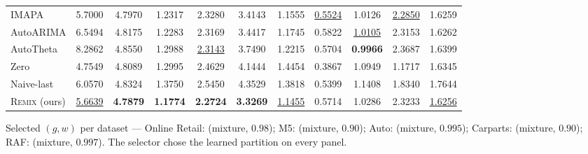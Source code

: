 \documentclass[twocolumn,10pt]{article}
\newcommand{\REMIX}{\textsc{Remix}}
\newcommand{\best}[1]{\textbf{#1}}
\newcommand{\secondbest}[1]{\underline{#1}}
\begin{document}
\begin{table}[t]
\begin{tabular}{lcc@{\hspace{10pt}}cc@{\hspace{10pt}}cc@{\hspace{10pt}}cc@{\hspace{10pt}}cc}
IMAPA & 5.7000 & 4.7970 & 1.2317 & 2.3280 & 3.4143 & 1.1555 & \secondbest{0.5524} & 1.0126 & \secondbest{2.2850} & 1.6259\\
AutoARIMA & 6.5494 & 4.8175 & 1.2283 & 2.3169 & 3.4417 & 1.1745 & 0.5822 & \secondbest{1.0105} & 2.3153 & 1.6262\\
AutoTheta & 8.2862 & 4.8550 & 1.2988 & \secondbest{2.3143} & 3.7490 & 1.2215 & 0.5704 & \best{0.9966} & 2.3687 & 1.6399\\
\midrule
Zero & 4.7549 & 4.8089 & 1.2995 & 2.4629 & 4.1444 & 1.4454 & 0.3867 & 1.0949 & 1.1717 & 1.6345\\
Naive-last & 6.0570 & 4.8324 & 1.3750 & 2.5450 & 4.3529 & 1.3818 & 0.5399 & 1.1408 & 1.8340 & 1.7644\\
\midrule
\REMIX{} (ours) & \secondbest{5.6639} & \best{4.7879} & \best{1.1774} & \best{2.2724} & \best{3.3269} & \secondbest{1.1455} & 0.5714 & 1.0286 & 2.3233 & \secondbest{1.6256}\\
\bottomrule
\end{tabular}

\smallskip
{\footnotesize Selected $(g,w)$ per dataset --- Online Retail:
(mixture, $0.98$); M5: (mixture, $0.90$); Auto: (mixture, $0.995$);
Carparts: (mixture, $0.90$); RAF: (mixture, $0.997$). The selector chose
the learned partition on every panel.}
\end{table}
\end{document}
